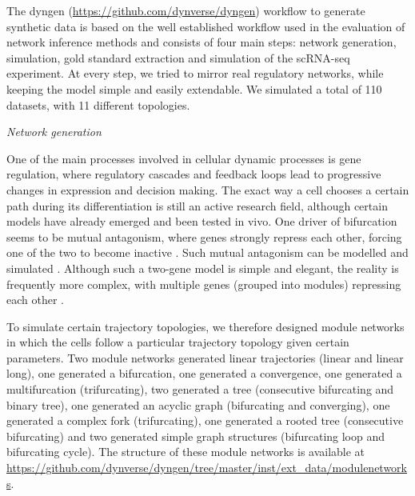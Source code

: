 The dyngen (\href{https://github.com/dynverse/dyngen}{https://github.com/dynverse/dyngen}) workflow to generate synthetic data is based on the well established workflow used in the evaluation of network inference methods \cite{schaffter_genenetweaversilicobenchmark_2011,marbach_wisdomcrowdsrobust_2012} and consists of four main steps: network generation, simulation, gold standard extraction and simulation of the scRNA-seq experiment. At every step, we tried to mirror real regulatory networks, while keeping the model simple and easily extendable. We simulated a total of 110 datasets, with 11 different topologies.

\hfill\break
\textit{Network generation}
\hfill\break

One of the main processes involved in cellular dynamic processes is gene regulation, where regulatory cascades and feedback loops lead to progressive changes in expression and decision making. The exact way a cell chooses a certain path during its differentiation is still an active research field, although certain models have already emerged and been tested in vivo. One driver of bifurcation seems to be mutual antagonism, where genes \cite{xu_regulationbifurcatingcell_2015} strongly repress each other, forcing one of the two to become inactive \cite{graf_forcingcellschange_2009}. Such mutual antagonism can be modelled and simulated \cite{wang_quantifyingwaddingtonlandscape_2011,ferrell_bistabilitybifurcationswaddington_2012}. Although such a two-gene model is simple and elegant, the reality is frequently more complex, with multiple genes (grouped into modules) repressing each other \cite{yosef_dynamicregulatorynetwork_2013}.

To simulate certain trajectory topologies, we therefore designed module networks in which the cells follow a particular trajectory topology given certain parameters. Two module networks generated linear trajectories (linear and linear long), one generated a bifurcation, one generated a convergence, one generated a multifurcation (trifurcating), two generated a tree (consecutive bifurcating and binary tree), one generated an acyclic graph (bifurcating and converging), one generated a complex fork (trifurcating), one generated a rooted tree (consecutive bifurcating) and two generated simple graph structures (bifurcating loop and bifurcating cycle). The structure of these module networks is available at \href{https://github.com/dynverse/dyngen/tree/master/inst/ext\_data/modulenetworks}{https://github.com/dynverse/dyngen/tree/master/inst/ext\_data/modulenetworks}.

